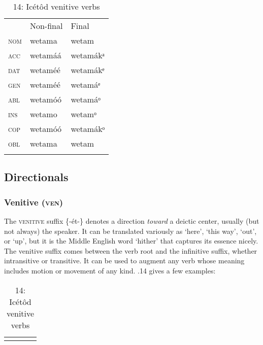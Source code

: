 \begin{table}
\begin{table}
\caption{13: Case declension of \textit{wetamá- }‘drink(able)’}
\label{tab:8}


\begin{tabularx}{\textwidth}{XXX} & Non-final & Final\\
\lsptoprule
\textsc{nom} & wetama & wetam\\
\textsc{acc} & wetamáá & wetamákᵃ\\
\textsc{dat} & wetaméé & wetamákᵉ\\
\textsc{gen} & wetaméé & wetamáᵉ\\
\textsc{abl} & wetamóó & wetamáᵒ\\
\textsc{ins} & wetamo & wetamᵒ\\
\textsc{cop} & wetamóó & wetamákᵒ\\
\textsc{obl} & wetama & wetam\\
\lspbottomrule
\end{tabularx}
\end{table}



\subsection{Directionals}
\subsubsection{Venitive (\textsc{ven})}

The \textsc{venitive }suffix \{-ét-\} denotes a direction \textit{toward} a deictic center, usually (but not always) the speaker. It can be translated variously as ‘here’, ‘this way’, ‘out’, or ‘up’, but it is the Middle English word ‘hither’ that captures its essence nicely. The venitive suffix comes between the verb root and the infinitive suffix, whether intransitive or transitive. It can be used to augment any verb whose meaning includes motion or movement of any kind. .14 gives a few examples:


\begin{table}
\caption{14: Icétôd venitive verbs}
\label{tab:8}


\begin{tabularx}{\textwidth}{XXXX}
\lsptoprule


\end{tabularx}
\end{table}
\end{table}
